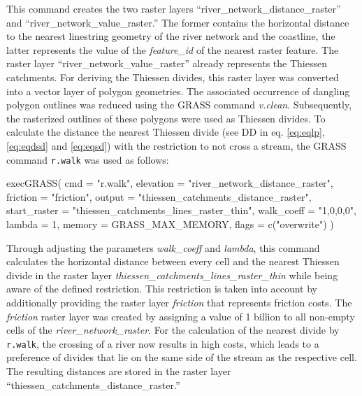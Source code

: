 \documentclass[fleqn,10pt]{wlscirep}
\newenvironment{Shaded}{\begin{snugshade}}{\end{snugshade}}
\newcommand{\AttributeTok}[1]{\textcolor[rgb]{0.77,0.63,0.00}{#1}}
\newcommand{\DecValTok}[1]{\textcolor[rgb]{0.00,0.00,0.81}{#1}}
\newcommand{\FunctionTok}[1]{\textcolor[rgb]{0.00,0.00,0.00}{#1}}
\newcommand{\NormalTok}[1]{#1}
\newcommand{\StringTok}[1]{\textcolor[rgb]{0.31,0.60,0.02}{#1}}
\begin{document}
\normalsize

This command creates the two raster layers ``river\_network\_distance\_raster'' and ``river\_network\_value\_raster.'' The former contains the horizontal distance to the nearest linestring geometry of the river network and the coastline, the latter represents the value of the \emph{feature\_id} of the nearest raster feature. The raster layer ``river\_network\_value\_raster'' already represents the Thiessen catchments. For deriving the Thiessen divides, this raster layer was converted into a vector layer of polygon geometries. The associated occurrence of dangling polygon outlines was reduced using the GRASS command \emph{v.clean}. Subsequently, the rasterized outlines of these polygons were used as Thiessen divides. To calculate the distance the nearest Thiessen divide (see DD in eq. \eqref{eq:eqlp}, \eqref{eq:eqdsd} and \eqref{eq:eqsd}) with the restriction to not cross a stream, the GRASS command \texttt{r.walk} was used as follows:

\footnotesize

\begin{Shaded}
\begin{Highlighting}[]
\FunctionTok{execGRASS}\NormalTok{(}
  \AttributeTok{cmd =} \StringTok{"r.walk"}\NormalTok{,}
  \AttributeTok{elevation =} \StringTok{"river\_network\_distance\_raster"}\NormalTok{,}
  \AttributeTok{friction =} \StringTok{"friction"}\NormalTok{,}
  \AttributeTok{output =} \StringTok{"thiessen\_catchments\_distance\_raster"}\NormalTok{,}
  \AttributeTok{start\_raster =} \StringTok{"thiessen\_catchments\_lines\_raster\_thin"}\NormalTok{,}
  \AttributeTok{walk\_coeff =} \StringTok{"1,0,0,0"}\NormalTok{,}
  \AttributeTok{lambda =} \DecValTok{1}\NormalTok{,}
  \AttributeTok{memory =}\NormalTok{ GRASS\_MAX\_MEMORY,}
  \AttributeTok{flags =} \FunctionTok{c}\NormalTok{(}\StringTok{"overwrite"}\NormalTok{)}
\NormalTok{)}
\end{Highlighting}
\end{Shaded}

\normalsize

Through adjusting the parameters \emph{walk\_coeff} and \emph{lambda}, this command calculates the horizontal distance between every cell and the nearest Thiessen divide in the raster layer \emph{thiessen\_catchments\_lines\_raster\_thin} while being aware of the defined restriction. This restriction is taken into account by additionally providing the raster layer \emph{friction} that represents friction costs. The \emph{friction} raster layer was created by assigning a value of 1 billion to all non-empty cells of the \emph{river\_network\_raster}. For the calculation of the nearest divide by \texttt{r.walk}, the crossing of a river now results in high costs, which leads to a preference of divides that lie on the same side of the stream as the respective cell. The resulting distances are stored in the raster layer ``thiessen\_catchments\_distance\_raster.''
\end{document}
